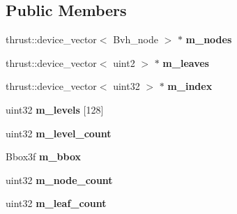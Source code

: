 \subsection*{Public Members}
\begin{DoxyCompactItemize}
\item 
\mbox{\label{structnih_1_1cuda_1_1_binned__sah__builder_a622cb42800e5ee4b2e7d7047b2d6a450}} 
thrust\+::device\+\_\+vector$<$ Bvh\+\_\+node $>$ $\ast$ {\bfseries m\+\_\+nodes}
\item 
\mbox{\label{structnih_1_1cuda_1_1_binned__sah__builder_ab82b4f8c71cc0a28aaf3aff2fde1b2a3}} 
thrust\+::device\+\_\+vector$<$ uint2 $>$ $\ast$ {\bfseries m\+\_\+leaves}
\item 
\mbox{\label{structnih_1_1cuda_1_1_binned__sah__builder_a4c533ca91518655498ceae8a8611dd88}} 
thrust\+::device\+\_\+vector$<$ uint32 $>$ $\ast$ {\bfseries m\+\_\+index}
\item 
\mbox{\label{structnih_1_1cuda_1_1_binned__sah__builder_ad2cba49707900fa31a015dcb432fa80d}} 
uint32 {\bfseries m\+\_\+levels} \mbox{[}128\mbox{]}
\item 
\mbox{\label{structnih_1_1cuda_1_1_binned__sah__builder_a78d373a27961b471aa5fbdfc86b2c08f}} 
uint32 {\bfseries m\+\_\+level\+\_\+count}
\item 
\mbox{\label{structnih_1_1cuda_1_1_binned__sah__builder_a7fa0f1ed12903bee53cfc6504913d5f8}} 
Bbox3f {\bfseries m\+\_\+bbox}
\item 
\mbox{\label{structnih_1_1cuda_1_1_binned__sah__builder_a28681b805d3b1b4eb4875827758b82e9}} 
uint32 {\bfseries m\+\_\+node\+\_\+count}
\item 
\mbox{\label{structnih_1_1cuda_1_1_binned__sah__builder_a5b71b3b0d4789254f8f4495b1f37c632}} 
uint32 {\bfseries m\+\_\+leaf\+\_\+count}
\item 
\mbox{\label{structnih_1_1cuda_1_1_binned__sah__builder_a9ab744938b3c86f84ec0e86375f0fb1b}} 

\end{DoxyCompactItemize}
